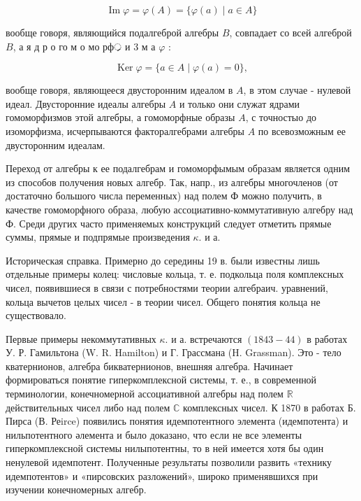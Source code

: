 \documentclass[10pt]{article}
\begin{document}
\[

\operatorname{Im} \varphi=\varphi(A)=\{\varphi(a) \mid a \in A\}

\]



вообще говоря, являющийся подалгеброй алгебры $B$, совпадает со всей алгеброй $B$, а я д р о го м о мо рф्र и 3 м а $\varphi$ :



\[

\operatorname{Ker} \varphi=\{a \in A \mid \varphi(a)=0\},

\]



вообще говоря, являющееся двусторонним идеалом в $A$, в этом случае - нулевой идеал. Двусторонние идеалы алгебры $A$ и только они служат ядрами гомоморфизмов этой алгебры, а гомоморфные образы $A$, с точностыо до изоморфизма, исчерпываются факторалгебрами алгебры $A$ по всевозможным ее двусторонним идеалам.



Переход от алгебры к ее подалгебрам и гомоморфымым образам является одним из способов получения новых алгебр. Так, напр., из алгебры многочленов (от достаточно большого числа переменных) над полем Ф можно получить, в качестве гомоморфного образа, любую ассоциативно-коммутативную алгебру над Ф. Среди других часто применяемых конструкций следует отметить прямые суммы, прямые и подпрямые произведения $\kappa$. и а.



Историческая справка. Примерно до середины 19 в. были известны лишь отдельные примеры колец: числовые кольца, т. е. подкольца поля комплексных чисел, появившиеся в связи с потребностями теории алгебраич. уравнений, кольца вычетов целых чисел - в теории чисел. Общего понятия кольца не существовало.



Первые примеры некоммутативных $\kappa$. и а. встречаются $(1843-44)$ в работах У. Р. Гамильтона (W. R. Hamilton) и Г. Грассмана (H. Grassman). Это - тело кватернионов, алгебра бикватернионов, внешняя алгебра. Начинает формироваться понятие гиперкомплексной системы, т. е., в современной терминологии, конечномерной ассоциативноӥ алгебры над полем $\mathbb{R}$ действительных чисел либо над полем $\mathbb{C}$ комплексных чисел. К 1870 в работах Б. Пирса (В. Реirce) появились понятия идемпотентного элемента (идемпотента) и нильпотентного әлемента и было доказано, что если не все элементы гиперкомплексной системы нилыпотентны, то в ней имеется хотя бы один ненулевой идемпотент. Полученные результаты позволили развить «технику идемпотентов» и «пирсовских разложений», широко применявшихся при изучении конечномерных алгебр.
\end{document}
